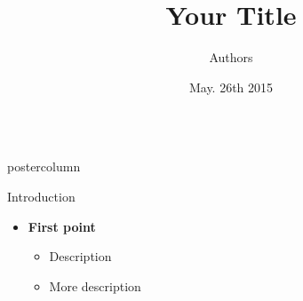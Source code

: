 \documentclass[final]{beamer}
\title{\huge Your Title }
\author{Authors }
\institute[Univerist\'e de Bourgogne]{Institute and Universities }
\date[May. 26th 2015]{May. 26th 2015}
\newlength{\columnheight}
\begin{document}
\begin{frame}
  \begin{columns}
    
    \begin{column}{.33\textwidth}
      \begin{beamercolorbox}[center,wd=\textwidth]{postercolumn}
        \begin{minipage}[T]{.95\textwidth}  %
          \parbox[t][\columnheight]{\textwidth}{ %

            \begin{block}{Introduction}
              \begin{itemize}
               \item \textbf{\color{orounam}First point }
               \begin{itemize}
               		\item Description 
               		\item More description
               \end{itemize}  
              \end{itemize}                 
            \end{block}
            \vfill
  
}
\end{minipage}
\end{beamercolorbox}
\end{column}
\end{columns}
\end{frame}
\end{document}
